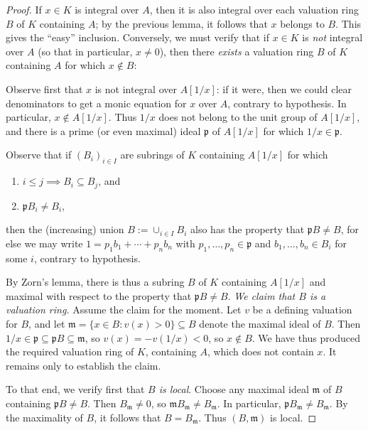\documentclass[10pt]{article}
\begin{document}
\begin{proof}
  If $x \in K$ is integral over $A$,
  then it is also integral over each valuation ring $B$ of $K$
  containing $A$;
  by the previous lemma, it follows that $x$ belongs to $B$.
  This gives the ``easy'' inclusion.
  Conversely,
  we must verify that if $x \in K$ is \emph{not} integral over
  $A$ (so that in particular, $x \neq 0$),
  then there \emph{exists} a valuation ring
  $B$ of $K$ containing $A$ for which $x \notin B$:

  Observe first that $x$ is not integral over $A[1/x]$:
  if it were,
  then we could clear denominators
  to get a monic equation for $x$ over $A$, contrary to
  hypothesis.
  In particular,
  $x \notin A[1/x]$.
  Thus $1/x$ does not belong to the unit group of $A[1/x]$,
  and there is a prime (or even maximal) ideal
  $\mathfrak{p}$ of $A[1/x]$
  for which $1/x \in \mathfrak{p}$.

  Observe that if $(B_i)_{i \in I}$
  are subrings of $K$ containing $A[1/x]$
  for which
  \begin{enumerate}
  \item $i \leq j \implies B_i \subseteq B_j$, and
  \item $\mathfrak{p} B_i \neq B_i$,
  \end{enumerate}
  then the (increasing) union $B := \cup_{i \in I} B_i$
  also has the property that $\mathfrak{p} B \neq B$,
  for else
  we may write $1 = p_1 b_1 + \dotsb + p_n b_n$
  with $p_1,\dotsc,p_n \in \mathfrak{p}$
  and $b_1,\dotsc,b_n \in B_i$ for some $i$,
  contrary to hypothesis.

  By Zorn's lemma, there is thus a subring $B$ of $K$ containing
  $A[1/x]$ and maximal with respect to the property that
  $\mathfrak{p} B \neq B$.
  \emph{We claim that $B$ is a valuation ring.}
  Assume the claim for the moment.
  Let $v$ be a defining valuation for $B$,
  and
  let $\mathfrak{m} = \{x \in B : v(x) > 0\} \subseteq B$ denote the maximal ideal of
  $B$.
  Then $1/x \in \mathfrak{p} \subseteq \mathfrak{p} B \subseteq
  \mathfrak{m}$,
  so $v(x) = - v(1/x) < 0$,
  so $x \notin B$.
  We have thus produced the required valuation ring
  of $K$, containing $A$,
  which does not contain $x$.
  It remains only to establish the claim.

  To that end, we verify first that \emph{$B$ is local}.
  Choose any maximal ideal $\mathfrak{m}$ of $B$
  containing $\mathfrak{p} B \neq B$.
  Then $B_\mathfrak{m} \neq 0$,
  so
  $\mathfrak{m} B_\mathfrak{m} \neq B_\mathfrak{m}$.
  In particular,
  $\mathfrak{p} B_\mathfrak{m} \neq B_\mathfrak{m}$.
  By the maximality of $B$,
  it follows that $B = B_\mathfrak{m}$.
  Thus $(B,\mathfrak{m})$ is local.


\end{proof}
\end{document}
